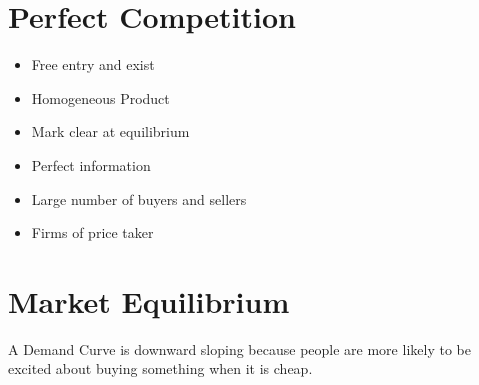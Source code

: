 \section{Perfect Competition}
\begin{itemize}
	\item Free entry and exist
	\item Homogeneous Product
	\item Mark clear at equilibrium
	\item Perfect information
	\item Large number of buyers and sellers
	\item Firms of price taker
\end{itemize}

\section{Market Equilibrium}
A Demand Curve is downward sloping because people are more likely to be excited about buying something when it is cheap.
